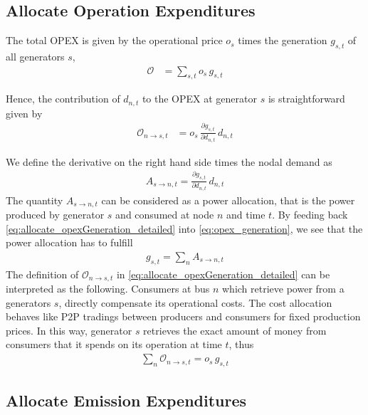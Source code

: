 \documentclass[11pt,twocolumn]{article}
\newcommand{\pdv}[2]{\frac{\partial #1}{\partial #2}}
\newcommand{\generation}{g_{s,t}}
\newcommand{\operationalpricegeneration}{o_{s}}
\newcommand{\demand}[1][n]{d_{#1,t}}
\newcommand{\allocatepeer}[1][s \rightarrow n]{A_{#1,t}}
\newcommand{\allocateopex}[1][n]{\mathcal{O}_{#1,t}}
\newcommand{\opexgeneration}{\mathcal{O}}
\begin{document}
\subsection{Allocate Operation Expenditures}

The total OPEX is given by the operational price $\operationalpricegeneration$ times the generation $\generation$ of all generators $s$, 
\begin{align}
 \opexgeneration& = \sum_{s,t} \operationalpricegeneration\,  \generation 
\label{eq:opex_generation}
 \end{align}

Hence, the contribution of $\demand$ to the OPEX at generator $s$ is straightforward given by
\begin{align}
    \allocateopex[n \rightarrow s] &= 
   \operationalpricegeneration \,  \pdv{\generation}{\demand} \, \demand
\label{eq:allocate_opexGeneration_detailed}
\end{align}

We define the derivative on the right hand side times the nodal demand as 
\begin{align}
 \allocatepeer = \pdv{\generation}{\demand} \, \demand
 \label{eq:allocate_peer}
\end{align}
% 
The quantity $\allocatepeer$ can be considered as a power allocation, that is the power produced by generator $s$ and consumed at node $n$ and time $t$.
By feeding back \cref{eq:allocate_opexGeneration_detailed} into \cref{eq:opex_generation}, we see that the power allocation has to fulfill
\begin{align}
\generation = \sum_n \allocatepeer
\label{eq:allocate_peer_constraint}
\end{align}
% 
% 
The definition of $\allocateopex[n \rightarrow s]$ in \cref{eq:allocate_opexGeneration_detailed} can be interpreted as the following. Consumers at bus $n$ which retrieve power from a generators $s$, directly  compensate its operational costs. The cost allocation behaves like P2P tradings between producers and consumers for fixed production prices. In this way,  generator $s$ retrieves the exact amount of money from consumers that it spends on its operation at time $t$, thus 
\begin{align}
\sum_{n} \allocateopex[n \rightarrow s] = \operationalpricegeneration \, \generation
\label{eq:no_profit_opex}
\end{align}

\subsection{Allocate Emission Expenditures}
\end{document}
